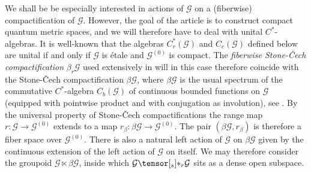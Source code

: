 \documentclass[11pt,a4paper,oneside,final,reqno]{amsart}
\theoremstyle{definition}
\newcommand{\G}{\mathcal{G}}
\newcommand{\Go}{\mathcal{G}^{(0)}}
\newcommand{\Cred}{C_{r}^{*}}
\numberwithin{equation}{section}
\begin{document}
	We shall be be especially interested in actions of $\G$ on a (fiberwise) compactification of $\G$. However, the goal of the article is to construct compact quantum metric spaces, and we will therefore have to deal with unital $C^*$-algebras. It is well-known that the algebras $\Cred(\G)$ and $C_c(\G)$ defined below are unital if and only if $\G$ is \'etale and $\Go$ is compact. The \emph{fiberwise Stone-\v{C}ech compactification} $\beta_r \G$ used extensively in \cite{DelarocheExactGroupoidsV3} will in this case therefore coincide with the  Stone-\v{C}ech compactification $\beta \G$, where $\beta \G$ is the usual spectrum of the commutative $C^*$-algebra $C_b (\G)$ of continuous bounded functions on $\G$ (equipped with pointwise product and with conjugation as involution), see \cite[pg. 127]{DelarocheExactGroupoidsV3}. 
	By the universal property of Stone-\v{C}ech compactifications the range map $r \colon \G \to \Go$ extends to a map $r_\beta \colon \beta \G \to \Go$. The pair $(\beta \G, r_\beta)$ is therefore a fiber space over $\Go$. There is also a natural left action of $\G$ on $\beta \G$ given by the continuous extension of the left action of $\G$ on itself. We may therefore consider the groupoid 
	$\G \ltimes \beta \G$, inside which $\G \tensor[_{s}]{*}{_r} \G$ sits as a dense open subspace. 
	
	
	
\end{document}
